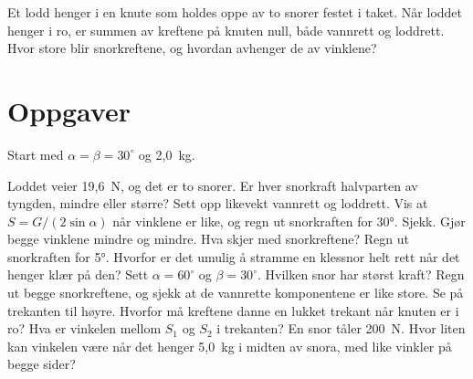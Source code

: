 \documentclass[11pt]{article}
\begin{document}

Et lodd henger i en knute som holdes oppe av to snorer festet i taket. Når loddet henger i ro, er summen av kreftene på knuten null, både vannrett og loddrett. Hvor store blir snorkreftene, og hvordan avhenger de av vinklene?

\section*{Oppgaver}

Start med $α = β = 30^{\circ}$ og 2,0~kg.

\begin{oppgaveliste}
\oppgave {}Loddet veier 19,6~N, og det er to snorer. Er hver snorkraft halvparten av tyngden, mindre eller større?
\svar
\oppgave {}Sett opp likevekt vannrett og loddrett. Vis at $S = G / (2 \sin  α)$ når vinklene er like, og regn ut snorkraften for 30°. Sjekk.
\svar
\oppgave {}Gjør begge vinklene mindre og mindre. Hva skjer med snorkreftene? Regn ut snorkraften for 5°.
\svar
\oppgave {}Hvorfor er det umulig å stramme en klessnor helt rett når det henger klær på den?
\svar
\oppgave {}Sett $α = 60^{\circ}$ og $β = 30^{\circ}$. Hvilken snor har størst kraft? Regn ut begge snorkreftene, og sjekk at de vannrette komponentene er like store.
\svar
\oppgave {}Se på trekanten til høyre. Hvorfor må kreftene danne en lukket trekant når knuten er i ro? Hva er vinkelen mellom $S_{1}$ og $S_{2}$ i trekanten?
\svar
\oppgave {}En snor tåler 200~N. Hvor liten kan vinkelen være når det henger 5,0~kg i midten av snora, med like vinkler på begge sider?
\svar
\end{oppgaveliste}
\end{document}
